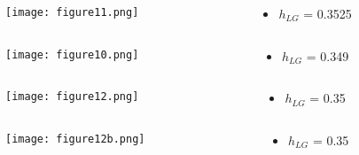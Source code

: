 \documentclass{beamer}
\begin{document}
\begin{frame}
\begin{columns}[t]
\begin{column}[T]{8cm}
\texttt{[image: figure11.png]}
\end{column}
\begin{column}[T]{3cm}
\begin{itemize}

\item $h_{LG}$ = 0.3525



\end{itemize}
\end{column}
\end{columns}
\end{frame}

\begin{frame}
\begin{columns}[t]
\begin{column}[T]{8cm}
\texttt{[image: figure10.png]}
\end{column}
\begin{column}[T]{3cm}
\begin{itemize}

\item $h_{LG}$ = 0.349



\end{itemize}
\end{column}
\end{columns}
\end{frame}


\begin{frame}
\begin{columns}[t]
\begin{column}[T]{8cm}
\texttt{[image: figure12.png]}
\end{column}
\begin{column}[T]{3cm}
\begin{itemize}

\item $h_{LG}$ = 0.35



\end{itemize}
\end{column}
\end{columns}
\end{frame}

\begin{frame}
\begin{columns}[t]
\begin{column}[T]{8cm}
\texttt{[image: figure12b.png]}
\end{column}
\begin{column}[T]{3cm}
\begin{itemize}

\item $h_{LG}$ = 0.35



\end{itemize}
\end{column}
\end{columns}
\end{frame}
\end{document}
